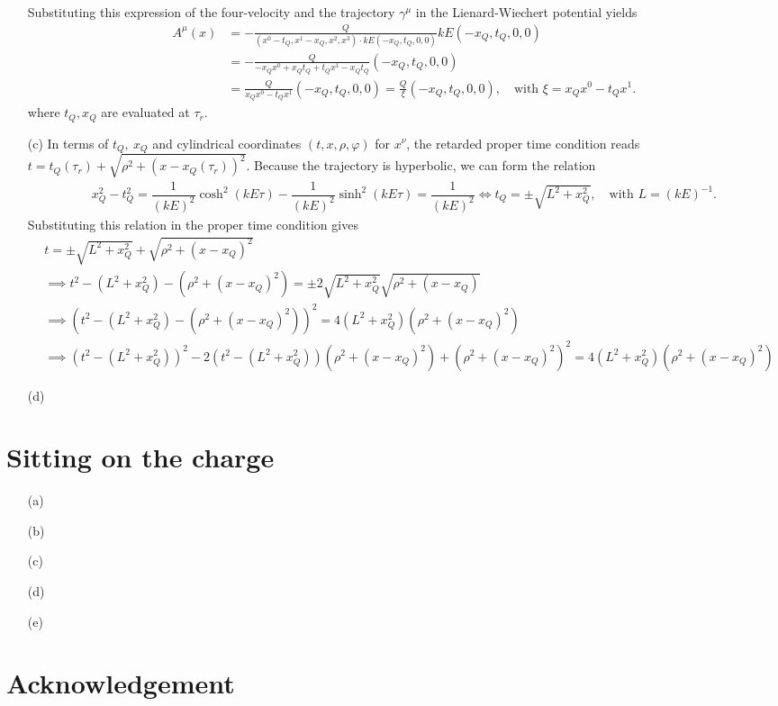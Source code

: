 \documentclass[10pt, a4paper]{article}
\begin{document}
\begin{enumerate}
  Substituting this expression of the four-velocity and the trajectory $\gamma^\mu$ in the Lienard-Wiechert potential yields
  \begin{align*}
    A^\mu(x)&=-\frac{Q}{\left(x^0-t_Q, x^1-x_Q, x^2, x^3\right) \cdot kE (-x_Q, t_Q, 0, 0)} kE (-x_Q, t_Q, 0, 0)\\
    &=-\frac{Q}{- x_Q x^0+ x_Qt_Q + t_Qx^1-x_Qt_Q}  (-x_Q, t_Q, 0, 0)\\
    &=\frac{Q}{x_Q x^0 - t_Qx^1}  (-x_Q, t_Q, 0, 0) = \frac{Q}{\xi}  (-x_Q, t_Q, 0, 0), \quad \text{with $\xi = x_Q x^0 - t_Qx^1$}.
 \end{align*}
 where $t_Q, x_Q$ are evaluated at $\tau_r$.
  \item[(c)] In terms of $t_Q,\ x_Q$ and cylindrical coordinates $(t, x, \rho, \varphi)$ for $x^{\nu}$, the retarded proper time condition reads $t=t_Q(\tau_r) + \sqrt{\rho^2 + (x-x_Q(\tau_r))^2}$. Because the trajectory is hyperbolic, we can form the relation 
  \begin{align*}
    x_Q^2 - t_Q^2 = \dfrac{1}{(kE)^2}\cosh^2(kE \tau) - \dfrac{1}{(kE)^2}\sinh^2(kE \tau) = \dfrac{1}{(kE)^2} \iff t_Q =\pm \sqrt{L^2 + x_Q^2}, \quad \text{with $L= (kE)^{-1}$}.
  \end{align*}
  \newpage
  Substituting this relation in the proper time condition gives 
  \begin{align*}
    &t=\pm \sqrt{L^2 + x_Q^2} + \sqrt{\rho^2 + (x-x_Q)^2}\\
    &\implies t^2-(L^2 + x_Q^2) - (\rho^2 + (x-x_Q)^2) = \pm 2\sqrt{L^2 + x_Q^2}\sqrt{\rho^2 + (x-x_Q)}\\
    &\implies  (t^2-(L^2 + x_Q^2) - (\rho^2 + (x-x_Q)^2))^2 = 4(L^2 + x_Q^2)(\rho^2 + (x-x_Q)^2)\\
    &\implies (t^2-(L^2 + x_Q^2))^2 -2(t^2-(L^2 + x_Q^2))(\rho^2 + (x-x_Q)^2) + (\rho^2 + (x-x_Q)^2)^2 = 4(L^2 + x_Q^2)(\rho^2 + (x-x_Q)^2)
  \end{align*}
  \item[(d)]
\end{enumerate}

\section{Sitting on the charge}
\begin{enumerate}
  \item[(a)]
  \item[(b)] 
  \item[(c)]
  \item[(d)]
  \item[(e)]   
\end{enumerate}  

\section{Acknowledgement}



\makereferences


\end{document}
